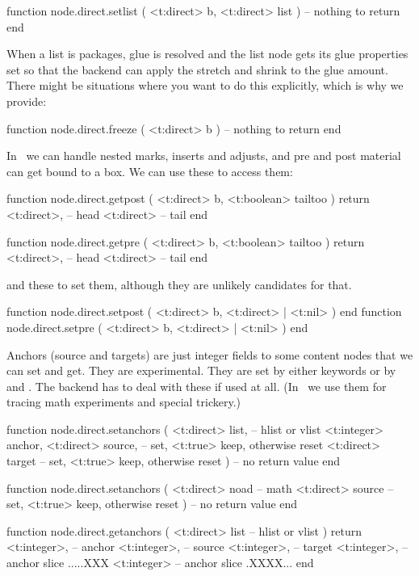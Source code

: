 function node.direct.setlist ( <t:direct> b, <t:direct> list )
    -- nothing to return
end
\stoptyping

When a list is packages, glue is resolved and the list node gets its glue properties
set so that the backend can apply the stretch and shrink to the glue amount. There might
be situations where you want to do this explicitly, which is why we provide:

\starttyping[option=LUA]
function node.direct.freeze ( <t:direct> b )
    -- nothing to return
end
\stoptyping

In \LUAMETATEX\ we can handle nested marks, inserts and adjusts, and
pre and post material can get bound to a box. We can use these to access them:

\starttyping[option=LUA]
function node.direct.getpost ( <t:direct> b, <t:boolean> tailtoo )
    return
        <t:direct>, -- head
        <t:direct>  -- tail
end

function node.direct.getpre ( <t:direct> b, <t:boolean> tailtoo )
    return
        <t:direct>, -- head
        <t:direct>  -- tail
end
\stoptyping

and these to set them, although they are unlikely candidates for that.

\starttyping[option=LUA]
function node.direct.setpost ( <t:direct> b, <t:direct> | <t:nil> ) end
function node.direct.setpre  ( <t:direct> b, <t:direct> | <t:nil> ) end
\stoptyping

Anchors (source and targets) are just integer fields to some content nodes that
we can set and get. They are experimental. They are set by either keywords or by
 and . The backend has to deal with these if
used at all. (In \CONTEXT\ we use them for tracing math experiments and special
trickery.)

\starttyping[option=LUA]
function node.direct.setanchors (
    <t:direct>  list,   -- hlist or vlist
    <t:integer> anchor,
    <t:direct>  source, -- set, <t:true> keep, otherwise reset
    <t:direct>  target  -- set, <t:true> keep, otherwise reset
)
    -- no return value
end

function node.direct.setanchors (
    <t:direct> noad -- math
    <t:direct> source -- set, <t:true> keep, otherwise reset
)
    -- no return value
end
\stoptyping

\starttyping[option=LUA]
function node.direct.getanchors (
    <t:direct> list  -- hlist or vlist
)
    return
        <t:integer>, -- anchor
        <t:integer>, -- source
        <t:integer>, -- target
        <t:integer>, -- anchor slice .....XXX
        <t:integer>  -- anchor slice .XXXX...
end

